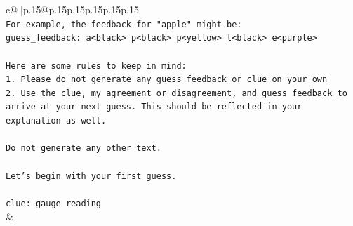 \documentclass{article}
\begin{document}
{\begin{supertabular}{c@{$\;$}|p{.15\linewidth}@{}p{.15\linewidth}p{.15\linewidth}p{.15\linewidth}p{.15\linewidth}p{.15\linewidth}}
{{{\\ 
\texttt{For example, the feedback for "apple" might be:} \\
\texttt{guess\_feedback: a<black> p<black> p<yellow> l<black> e<purple>} \\
\\ 
\texttt{Here are some rules to keep in mind:} \\
\texttt{1. Please do not generate any guess feedback or clue on your own} \\
\texttt{2. Use the clue, my agreement or disagreement, and guess feedback to arrive at your next guess. This should be reflected in your explanation as well.} \\
\\ 
\texttt{Do not generate any other text.} \\
\\ 
\texttt{Let's begin with your first guess.} \\
\\ 
\texttt{clue: gauge reading} \\
            }
        }
    }
    & \\ \\


\end{supertabular}}
\end{document}
